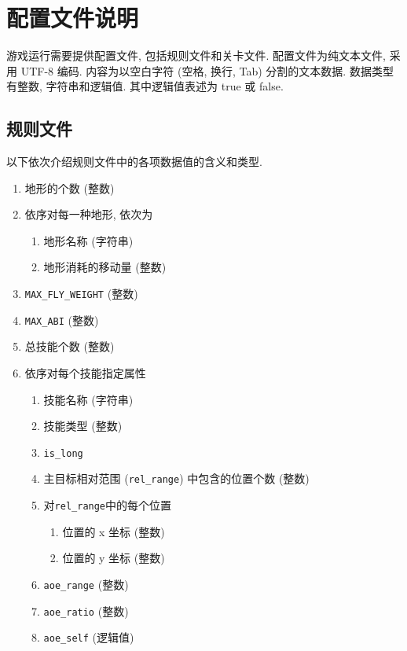 \documentclass[UTF8, zihao=-4]{ctexart} %
\newcommand{\lcode}{\lstinline} % 段内插入代码
\begin{document}
\section{配置文件说明}
\label{s_conf}
游戏运行需要提供配置文件, 包括规则文件和关卡文件. 配置文件为纯文本文件, 采用 UTF-8 编码. 
内容为以空白字符 (空格, 换行, Tab) 分割的文本数据. 数据类型有整数, 字符串和逻辑值. 
其中逻辑值表述为 true 或 false.
\subsection{规则文件}
以下依次介绍规则文件中的各项数据值的含义和类型.
\begin{enumerate}
      \item 地形的个数 (整数)
      \item 依序对每一种地形, 依次为
            \begin{enumerate}
                  \item 地形名称 (字符串)
                  \item 地形消耗的移动量 (整数)
            \end{enumerate}
      \item \lcode{MAX_FLY_WEIGHT} (整数)
      \item \lcode{MAX_ABI} (整数)
      \item 总技能个数 (整数)
      \item 依序对每个技能指定属性
            \begin{enumerate}
                  \item 技能名称 (字符串)
                  \item 技能类型 (整数)
                  \item \lcode{is_long}
                  \item 主目标相对范围 (\lcode{rel_range}) 中包含的位置个数 (整数)
                  \item 对\lcode{rel_range}中的每个位置
                        \begin{enumerate}
                              \item 位置的 x 坐标 (整数)
                              \item 位置的 y 坐标 (整数)
                        \end{enumerate}
                  \item \lcode{aoe_range} (整数)
                  \item \lcode{aoe_ratio} (整数)
                  \item \lcode{aoe_self} (逻辑值)

\end{enumerate}
\end{enumerate}
\end{document}
